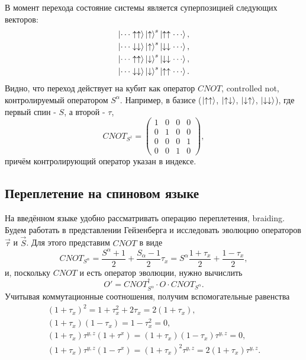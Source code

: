 \documentclass[a4paper,12pt]{article}
\theoremstyle{plain} %
\theoremstyle{definition} %
\theoremstyle{remark} %
\begin{document}
В момент перехода состояние системы является суперпозицией следующих векторов:
\begin{equation}
\begin{split}
    \ket{\dotsm \uparrow \uparrow} \ket{\uparrow}^s \ket{\uparrow \uparrow \dotsm}, \\
    \ket{\dotsm \downarrow \downarrow} \ket{\uparrow}^s \ket{\downarrow \downarrow \dotsm}, \\
    \ket{\dotsm \uparrow \uparrow} \ket{\downarrow}^s \ket{\downarrow \downarrow \dotsm}, \\
    \ket{\dotsm \downarrow \downarrow} \ket{\downarrow}^s \ket{\uparrow \uparrow \dotsm}.
\end{split}
\label{eq:transition_states}
\end{equation}
Видно, что переход действует на кубит как оператор $CNOT$, controlled not, контролируемый оператором $S^\alpha$. Например, в базисе ($\ket{\uparrow\uparrow}$, $\ket{\uparrow\downarrow}$, $\ket{\downarrow\uparrow}$, $\ket{\downarrow\downarrow}$), где первый спин - $S$, а второй - $\tau$,
\begin{equation}
CNOT_{S^z} = 
\begin{pmatrix}
    1 & 0 & 0 & 0 \\
    0 & 1 & 0 & 0 \\
    0 & 0 & 0 & 1 \\
    0 & 0 & 1 & 0
\end{pmatrix},
\end{equation}
причём контролирующий оператор указан в индексе.

\pagebreak

\subsection{Переплетение на спиновом языке} \label{sec:spin_braiding}
На введённом языке удобно рассматривать операцию переплетения, braiding. Будем работать в представлении Гейзенберга и исследовать эволюцию операторов $\vec{\tau}$ и $\vec{S}$. Для этого представим $CNOT$ в виде
\begin{equation}
    CNOT_{S^\alpha} = \frac{S^\alpha + 1}{2} + \frac{S_\alpha - 1}{2} \tau_x 
    = S^\alpha \frac{1 + \tau_x}{2} + \frac{1 - \tau_x}{2},
\end{equation}
и, поскольку $CNOT$ и есть оператор эволюции, нужно вычислить
\begin{equation}
    O' = CNOT_{S^\alpha}^\dagger \cdot O \cdot CNOT_{S^\alpha}.
    \label{eq:cnot_transformation}
\end{equation}
Учитывая коммутационные соотношения, получим вспомогательные равенства
\begin{gather}
    (1 + \tau_x)^2 = 1 + \tau_x^2 + 2 \tau_x = 2 (1 + \tau_x), \\
    (1 + \tau_x) (1 - \tau_x) = 1 - \tau_x^2 = 0, \\
    (1 + \tau_x) \tau^{y,z} (1 + \tau^x) = (1 + \tau_x) (1 - \tau_x) \tau^{y,z} = 0, \\
    (1 + \tau_x) \tau^{y,z} (1 - \tau^x) = (1 + \tau_x)^2 \tau^{y,z} = 2 (1 + \tau_x) \tau^{y,z}.
\end{gather}
\end{document}
